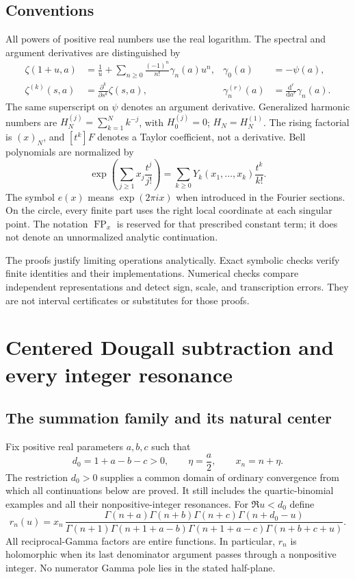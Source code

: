 \documentclass[11pt,a4paper]{article}
\numberwithin{equation}{section}
\theoremstyle{definition}
\theoremstyle{remark}
\DeclareMathOperator{\FP}{FP}
\begin{document}
\subsection{Conventions}
All powers of positive real numbers use the real logarithm. The spectral
and argument derivatives are distinguished by
\begin{align}
 \zeta(1+u,a)&=\frac1u+\sum_{n\ge0}\frac{(-1)^n}{n!}\gamma_n(a)u^n,
 &\gamma_0(a)&=-\psi(a), \label{eq:laurent}\\
 \zeta^{(k)}(s,a)&=\frac{\partial^k}{\partial s^k}\zeta(s,a),
 &\gamma_n^{(r)}(a)&=\frac{\mathrm d^r}{\mathrm da^r}\gamma_n(a).
\end{align}
The same superscript on $\psi$ denotes an argument derivative. Generalized
harmonic numbers are $H_N^{(j)}=\sum_{k=1}^Nk^{-j}$, with $H_0^{(j)}=0$;
$H_N=H_N^{(1)}$. The rising factorial is $(x)_N$, and $[t^k]F$ denotes a
Taylor coefficient, not a derivative. Bell polynomials are normalized by
\[
 \exp\!\left(\sum_{j\ge1}x_j\frac{t^j}{j!}\right)
 =\sum_{k\ge0}Y_k(x_1,\ldots,x_k)\frac{t^k}{k!}.
\]
The symbol $e(x)$ means $\exp(2\pi i x)$ when introduced in the Fourier
sections. On the circle, every finite part uses the right local
coordinate at each singular point. The notation $\FP_x$ is reserved for
that prescribed constant term; it does not denote an unnormalized
analytic continuation.

The proofs justify limiting operations analytically. Exact symbolic
checks verify finite identities and their implementations. Numerical
checks compare independent representations and detect sign, scale, and
transcription errors. They are not interval certificates or substitutes
for those proofs.


\section{Centered Dougall subtraction and every integer resonance}
\label{dg:section}

\subsection{The summation family and its natural center}
Fix positive real parameters $a,b,c$ such that
\begin{equation}\label{dg:domain}
 d_0=1+a-b-c>0,\qquad \eta=\frac a2,\qquad x_n=n+\eta.
\end{equation}
The restriction $d_0>0$ supplies a common domain of ordinary convergence
from which all continuations below are proved. It still includes the
quartic-binomial examples and all their nonpositive-integer resonances.
For $\Re u<d_0$ define
\begin{equation}\label{dg:rn}
 r_n(u)=x_n\,
 \frac{\Gamma(n+a)\Gamma(n+b)\Gamma(n+c)\Gamma(n+d_0-u)}
 {\Gamma(n+1)\Gamma(n+1+a-b)\Gamma(n+1+a-c)
  \Gamma(n+b+c+u)}.
\end{equation}
All reciprocal-Gamma factors are entire functions. In particular,
$r_n$ is holomorphic when its last denominator argument passes through
a nonpositive integer. No numerator Gamma pole lies in the stated
half-plane.
\end{document}
